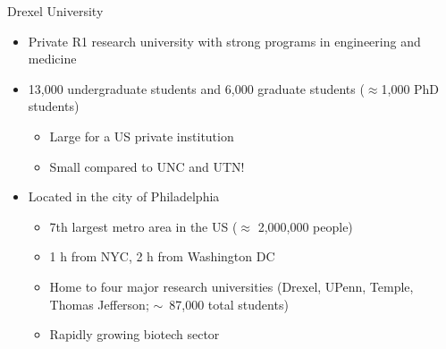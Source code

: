 \begin{frame}[fragile]{Drexel University}
\begin{itemize}
    \item Private R1 research university with strong programs in engineering and medicine
    \item 13,000 undergraduate students and 6,000 graduate students ($\approx$1,000 PhD students)
    \begin{itemize}
        \item Large for a US private institution
        \item Small compared to UNC and UTN!
    \end{itemize}
    \item Located in the city of Philadelphia
    \begin{itemize}
        \item 7th largest metro area in the US ($\approx$ 2,000,000 people)
        \item 1 h from NYC, 2 h from Washington DC
        \item Home to four major research universities (Drexel, UPenn, Temple, Thomas Jefferson; $\sim$~87,000 total students)
        \item Rapidly growing biotech sector
    \end{itemize}
\end{itemize}
\end{frame}

